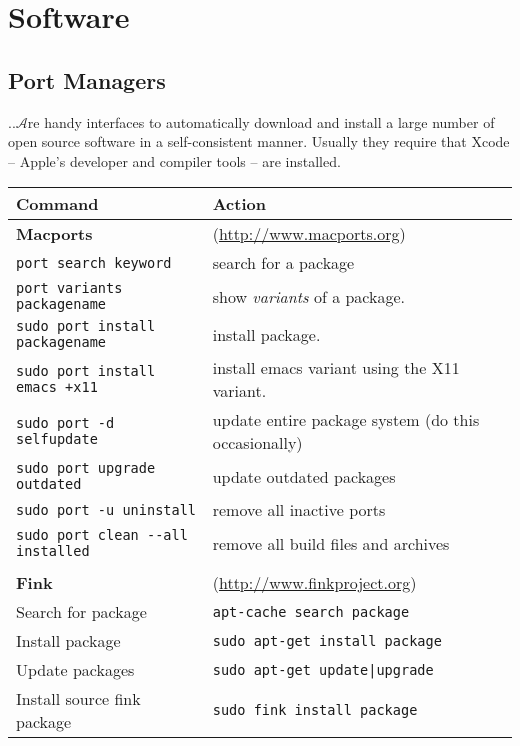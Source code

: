 \documentclass[a4paper,10pt]{article}
\begin{document}

\section{Software}
\subsection{\label{sec:ports}Port Managers}
..$\mathcal{A}$re handy interfaces to automatically download and install a large number of open source software in a self-consistent manner. Usually they require that Xcode -- Apple's developer and compiler tools -- are installed.
\begin{table}[h!]
\center
\begin{small}
\begin{tabular}{ll}\hline\hline
Command              & Action \\\hline
\textbf{Macports}    & (\url{http://www.macports.org})\\
\verb"port search keyword" & search for a package\\
\verb+port variants packagename+ & show \emph{variants} of a package.\\
\verb"sudo port install packagename" & install package.\\
\verb"sudo port install emacs +x11" & install emacs variant using the X11 variant.\\
\verb"sudo port -d selfupdate" & update entire package system (do this occasionally)\\
\verb"sudo port upgrade outdated" & update outdated packages\\
\verb"sudo port -u uninstall"      & remove all inactive ports\\
\verb"sudo port clean --all installed" & remove all build files and archives\\
\\
\textbf{Fink}       & (\url{http://www.finkproject.org})\\
Search for package  & \verb"apt-cache search package"\\
Install package     & \verb"sudo apt-get install package"\\
Update packages     &  \verb"sudo apt-get update|upgrade"\\
Install source fink package & \verb"sudo fink install package"\\\hline
\end{tabular}\end{small}\end{table}
\end{document}
